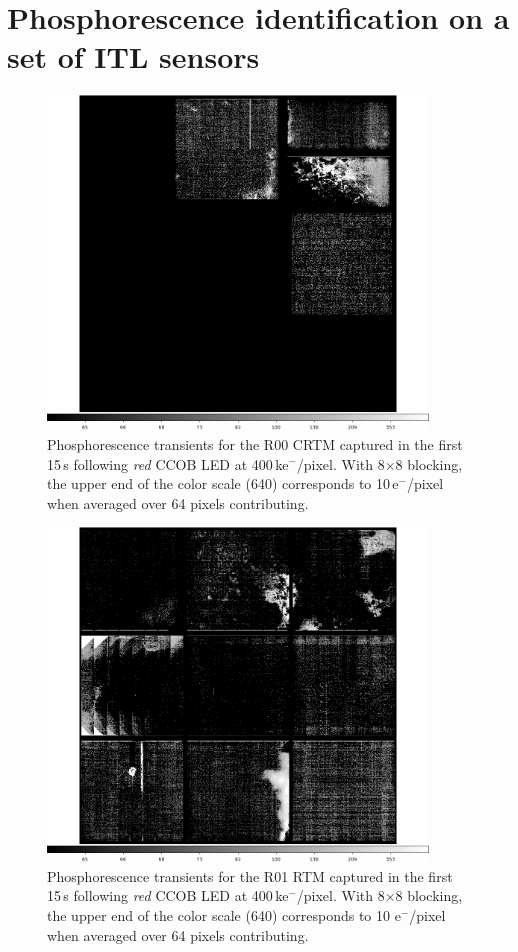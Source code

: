 \section{Phosphorescence identification on a set of ITL sensors}
\label{appendix:phos:ident}
\begin{figure}[!htbp]
\centering
\includegraphics[width=0.9\textwidth]{figures/phosphorescence-survey/itl_fluor_R00_0-19_rb1_log.png}
\caption{Phosphorescence transients for the R00 CRTM captured in the first 15\,s following {\it red} CCOB LED at 400\,ke$^-$/pixel. With 8$\times$8 blocking, the upper end of the color scale (640) corresponds to 10\,e$^-$/pixel when averaged over 64 pixels contributing.}
\label{fig:phos:R00}
\end{figure}

\begin{figure}[!htbp]
\centering
\includegraphics[width=0.9\textwidth]{figures/phosphorescence-survey/itl_fluor_R01_0-19_rb1_log.png}
\caption{Phosphorescence transients for the R01 RTM captured in the first 15\,s following {\it red} CCOB LED at 400\,ke$^-$/pixel. With 8$\times$8 blocking, the upper end of the color scale (640) corresponds to 10 e$^-$/pixel when averaged over 64 pixels contributing.}
\label{fig:phos:R01}
\end{figure}

